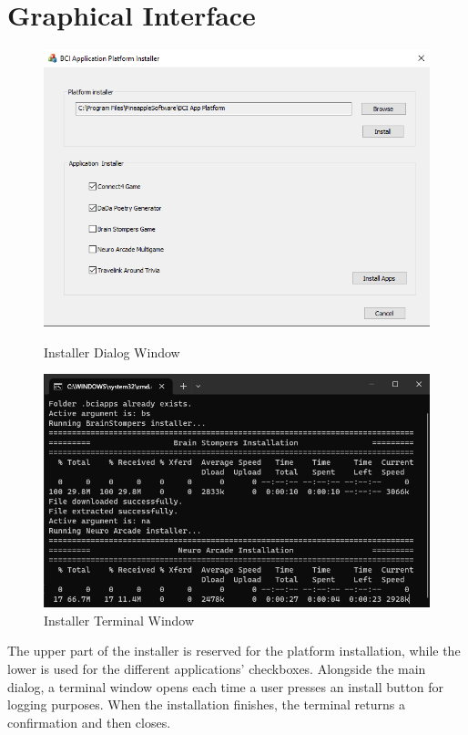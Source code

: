 \section{Graphical Interface} \label{sect:Installer GUI}
\begin{figure}[H]
    \begin{minipage}[c]{0.45\linewidth}
      \includegraphics[width=\linewidth]{Graphics/Installer GUI.png}
      \caption{Installer Dialog Window}
      \end{minipage}
    \hfill
    \begin{minipage}[c]{0.45\linewidth}
      \includegraphics[width=\linewidth]{Graphics/Installer Terminal.png}
      \caption{Installer Terminal Window}
  \end{minipage}%
\end{figure}
The upper part of the installer is reserved for the platform installation, while the lower is used for the different applications' checkboxes. Alongside the main dialog, a terminal window opens each time a user presses an install button for logging purposes. When the installation finishes, the terminal returns a confirmation and then closes.


